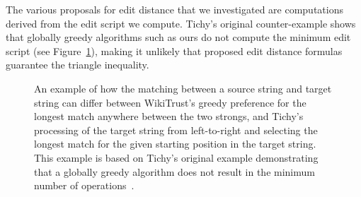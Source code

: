 The various proposals for edit distance that we investigated are
computations derived from the edit script we compute.
Tichy's original counter-example shows that globally greedy algorithms
such as ours do not compute the minimum edit script
(see Figure~\ref{fig:match-comparison}), making it unlikely that
proposed edit distance formulas guarantee the triangle inequality.

\begin{figure}[htbp]
\centering
  \hspace{2ex}
\caption{
  An example of how the matching between a source string and target string
  can differ between WikiTrust's greedy preference for the longest match
  anywhere between the two strongs, and Tichy's processing of the
  target string from left-to-right and selecting the longest match
  for the given starting position in the target string.
  This example is based on Tichy's original example demonstrating that
  a globally greedy algorithm does not result in the minimum number of
  operations~\cite{Tichy1984}.
}
\label{fig:match-comparison}
\end{figure}

